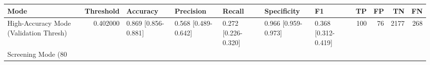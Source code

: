 \begin{tabular}{lrlllllrrrr}
\toprule
Mode & Threshold & Accuracy & Precision & Recall & Specificity & F1 & TP & FP & TN & FN \\
\midrule
High-Accuracy Mode (Validation Thresh) & 0.402000 & 0.869 [0.856-0.881] & 0.568 [0.489-0.642] & 0.272 [0.226-0.320] & 0.966 [0.959-0.973] & 0.368 [0.312-0.419] & 100 & 76 & 2177 & 268 \\
Screening Mode (80%
\bottomrule
\end{tabular}
